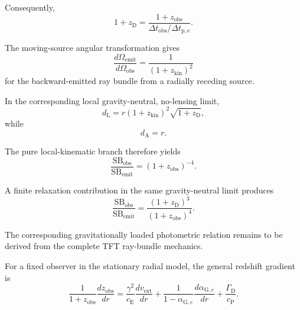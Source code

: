 Consequently,
\begin{equation}
    \boxed{
    1+z_{\mathrm D}
    =
    \frac{
        1+z_{\mathrm{obs}}
    }{
        \Delta t_{\mathrm{obs}}/\Delta t_{\mathrm{p,e}}
    }.
    }
\end{equation}

The moving-source angular transformation gives
\begin{equation}
    \frac{
        d\Omega_{\mathrm{emit}}
    }{
        d\Omega_{\mathrm{obs}}
    }
    =
    \frac{1}{
        (1+z_{\mathrm{kin}})^2
    }
\end{equation}
for the backward-emitted ray bundle from a radially receding source.

In the corresponding local gravity-neutral, no-lensing limit,
\begin{equation}
    d_{\mathrm L}
    =
    r
    (1+z_{\mathrm{kin}})^2
    \sqrt{
        1+z_{\mathrm D}
    },
\end{equation}
while
\begin{equation}
    d_{\mathrm A}
    =
    r.
\end{equation}

The pure local-kinematic branch therefore yields
\begin{equation}
    \frac{
        \mathrm{SB}_{\mathrm{obs}}
    }{
        \mathrm{SB}_{\mathrm{emit}}
    }
    =
    (1+z_{\mathrm{obs}})^{-4}.
\end{equation}

A finite relaxation contribution in the same gravity-neutral limit produces
\begin{equation}
    \frac{
        \mathrm{SB}_{\mathrm{obs}}
    }{
        \mathrm{SB}_{\mathrm{emit}}
    }
    =
    \frac{
        (1+z_{\mathrm D})^3
    }{
        (1+z_{\mathrm{obs}})^4
    }.
\end{equation}

The corresponding gravitationally loaded photometric relation remains to be
derived from the complete TFT ray-bundle mechanics.

For a fixed observer in the stationary radial model, the general redshift
gradient is
\begin{equation}
    \boxed{
    \frac{1}{
        1+z_{\mathrm{obs}}
    }
    \frac{
        dz_{\mathrm{obs}}
    }{
        dr
    }
    =
    \frac{
        \gamma^2
    }{
        c_{\mathrm E}
    }
    \frac{
        dv_{\mathrm{ext}}
    }{
        dr
    }
    +
    \frac{1}{
        1-\alpha_{\mathrm G,e}
    }
    \frac{
        d\alpha_{\mathrm G,e}
    }{
        dr
    }
    +
    \frac{
        \Gamma_{\mathrm D}
    }{
        c_{\mathrm P}
    }.
    }
\end{equation}

